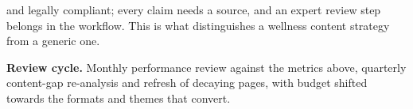 \begin{qlist}
\begin{apts}
      and legally compliant; every claim needs a source, and an expert review
      step belongs in the workflow. This is what distinguishes a wellness
      content strategy from a generic one.
\item \textbf{Review cycle.} Monthly performance review against the metrics
      above, quarterly content-gap re-analysis and refresh of decaying pages,
      with budget shifted towards the formats and themes that convert.
\end{apts}


\end{qlist}
